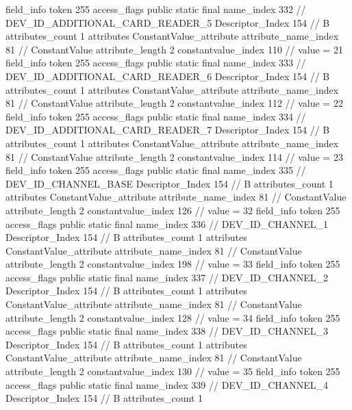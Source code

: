 {{{{{{{				}
				}
			}
			field_info {
				token	255
				access_flags	public static final
				name_index	332		// DEV_ID_ADDITIONAL_CARD_READER_5
				Descriptor_Index	154		// B
				attributes_count	1
				attributes {
				ConstantValue_attribute {
					attribute_name_index	81		// ConstantValue
					attribute_length	2
					constantvalue_index	110		// value = 21
				}
				}
			}
			field_info {
				token	255
				access_flags	public static final
				name_index	333		// DEV_ID_ADDITIONAL_CARD_READER_6
				Descriptor_Index	154		// B
				attributes_count	1
				attributes {
				ConstantValue_attribute {
					attribute_name_index	81		// ConstantValue
					attribute_length	2
					constantvalue_index	112		// value = 22
				}
				}
			}
			field_info {
				token	255
				access_flags	public static final
				name_index	334		// DEV_ID_ADDITIONAL_CARD_READER_7
				Descriptor_Index	154		// B
				attributes_count	1
				attributes {
				ConstantValue_attribute {
					attribute_name_index	81		// ConstantValue
					attribute_length	2
					constantvalue_index	114		// value = 23
				}
				}
			}
			field_info {
				token	255
				access_flags	public static final
				name_index	335		// DEV_ID_CHANNEL_BASE
				Descriptor_Index	154		// B
				attributes_count	1
				attributes {
				ConstantValue_attribute {
					attribute_name_index	81		// ConstantValue
					attribute_length	2
					constantvalue_index	126		// value = 32
				}
				}
			}
			field_info {
				token	255
				access_flags	public static final
				name_index	336		// DEV_ID_CHANNEL_1
				Descriptor_Index	154		// B
				attributes_count	1
				attributes {
				ConstantValue_attribute {
					attribute_name_index	81		// ConstantValue
					attribute_length	2
					constantvalue_index	198		// value = 33
				}
				}
			}
			field_info {
				token	255
				access_flags	public static final
				name_index	337		// DEV_ID_CHANNEL_2
				Descriptor_Index	154		// B
				attributes_count	1
				attributes {
				ConstantValue_attribute {
					attribute_name_index	81		// ConstantValue
					attribute_length	2
					constantvalue_index	128		// value = 34
				}
				}
			}
			field_info {
				token	255
				access_flags	public static final
				name_index	338		// DEV_ID_CHANNEL_3
				Descriptor_Index	154		// B
				attributes_count	1
				attributes {
				ConstantValue_attribute {
					attribute_name_index	81		// ConstantValue
					attribute_length	2
					constantvalue_index	130		// value = 35
				}
				}
			}
			field_info {
				token	255
				access_flags	public static final
				name_index	339		// DEV_ID_CHANNEL_4
				Descriptor_Index	154		// B
				attributes_count	1
}}}}}

